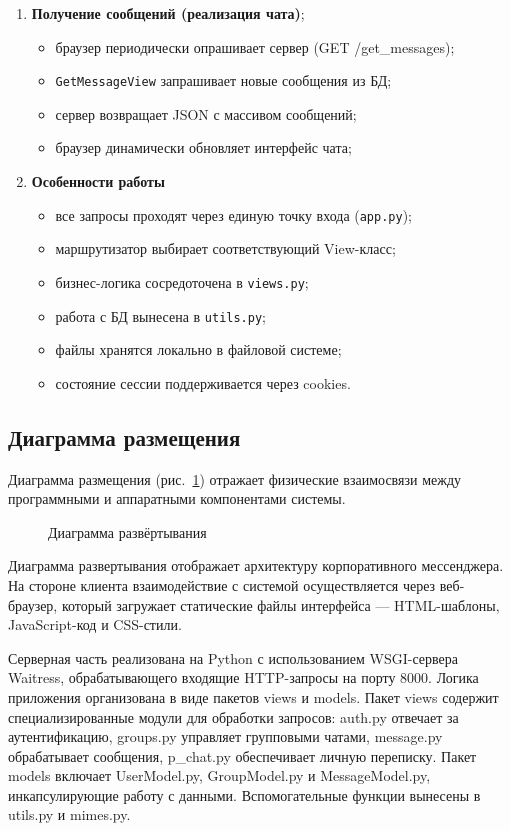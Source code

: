 \begin{enumerate}[leftmargin=*,label=\textbf{\arabic*.}]
	\item \textbf{Получение сообщений (реализация чата)};
	\begin{itemize}
		\item браузер периодически опрашивает сервер (GET /get\_messages);
		\item \texttt{GetMessageView} запрашивает новые сообщения из БД;
		\item сервер возвращает JSON с массивом сообщений;
		\item браузер динамически обновляет интерфейс чата;
	\end{itemize}
	
	\item \textbf{Особенности работы}
	\begin{itemize}
		\item все запросы проходят через единую точку входа (\texttt{app.py});
		\item маршрутизатор выбирает соответствующий View-класс;
		\item бизнес-логика сосредоточена в \texttt{views.py};
		\item работа с БД вынесена в \texttt{utils.py};
		\item файлы хранятся локально в файловой системе;
		\item состояние сессии поддерживается через cookies.
	\end{itemize}
\end{enumerate}

\subsection{Диаграмма размещения}

Диаграмма размещения (рис.~\ref{place:image}) отражает физические взаимосвязи между программными и аппаратными компонентами системы.

\begin{figure}[ht]
\caption{Диаграмма развёртывания}
\label{place:image}
\end{figure}

Диаграмма развертывания отображает архитектуру корпоративного мессенджера. На стороне клиента взаимодействие с системой осуществляется через веб-браузер, который загружает статические файлы интерфейса — HTML-шаблоны, JavaScript-код и CSS-стили.

Серверная часть реализована на Python с использованием WSGI-сервера Waitress, обрабатывающего входящие HTTP-запросы на порту 8000. Логика приложения организована в виде пакетов views и models. Пакет views содержит специализированные модули для обработки запросов: auth.py отвечает за аутентификацию, groups.py управляет групповыми чатами, message.py обрабатывает сообщения, p\_chat.py обеспечивает личную переписку. Пакет models включает UserModel.py, GroupModel.py и MessageModel.py, инкапсулирующие работу с данными. Вспомогательные функции вынесены в utils.py и mimes.py.


